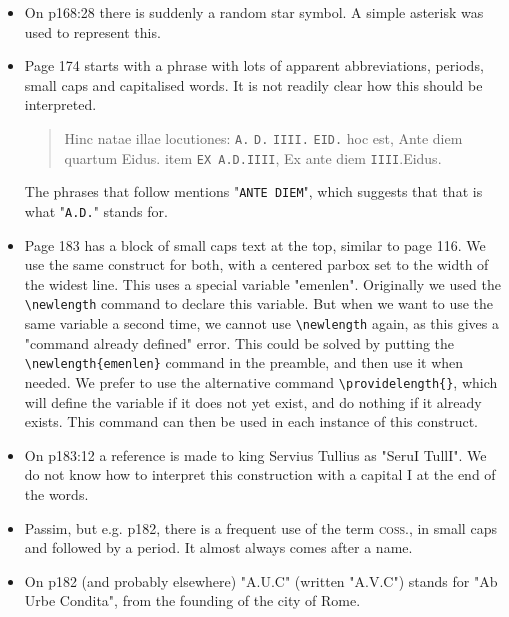 \documentclass{report}
\begin{document}
\begin{itemize}
Any changes to the \verb+\rnum{}+ command or the main font choice
should check if the rendering inside
italics works well.
\item
On p168:28 there is suddenly a random star symbol.
A simple asterisk was used to represent this.
\item
Page 174 starts with a phrase with lots of apparent abbreviations,
periods, small caps and capitalised words.
It is not readily clear how this should be interpreted.
\begin{quote}
Hinc natae illae locutiones:
 \texttt{A.} \texttt{D.} \texttt{IIII.} \texttt{EID.} hoc est, Ante diem
quartum Eidus. item \texttt{EX A.D.IIII}, Ex ante diem \texttt{IIII}.Eidus.
\end{quote}
The phrases that follow mentions "\texttt{ANTE DIEM}", which suggests that
that is what "\texttt{A.D.}" stands for.
\item
Page 183 has a block of small caps text at the top, similar to page 116.
We use the same construct for both, with a centered parbox set to the width of
the widest line.
This uses a special variable "emenlen".
Originally we used the \verb+\newlength+ command to declare this variable.
But when we want to use the same variable a second time,
we cannot use \verb+\newlength+
again, as this gives a "command already defined" error.
This could be solved by putting the \verb+\newlength{emenlen}+ command in the
preamble, and then use it when needed.
We prefer to use the alternative command \verb+\providelength{}+, which will
define the variable if it does not yet exist,
and do nothing if it already exists.
This command can then be used in each instance of this construct.
\item
On p183:12 a reference is made to king Servius Tullius as "SeruI TullI".
We do not know how to interpret this construction with a capital I at
the end of the words.
\item
Passim, but e.g. p182, there is a frequent use of the term \textsc{coss.},
in small caps and followed by a period.
It almost always comes after a name.
\item
On p182 (and probably elsewhere) "A.U.C" (written "A.V.C") stands for
"Ab Urbe Condita", from the founding of the city of Rome.
\end{itemize}
\end{document}

